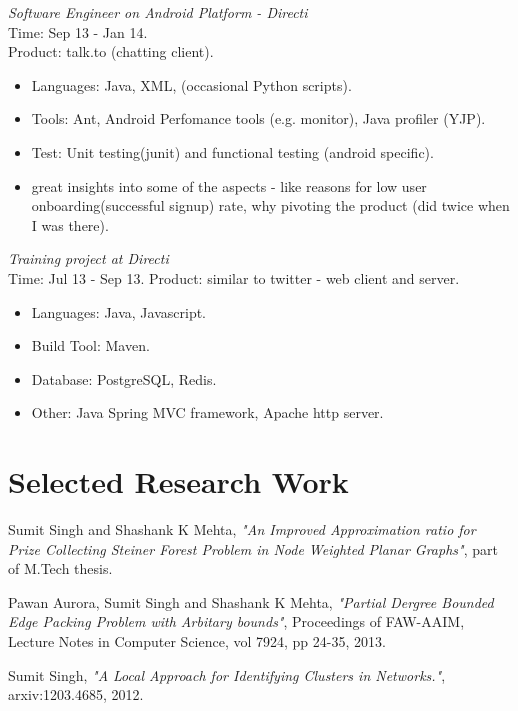 \documentclass[margin,line]{resume}
\begin{document}
\begin{resume}
\textit{Software Engineer on Android Platform - Directi} \\
Time: Sep 13 - Jan 14.\\
Product: talk.to (chatting client).\\
\begin{itemize}
\item Languages: Java, XML, (occasional Python scripts).
\item Tools: Ant, Android Perfomance tools (e.g. monitor), Java profiler (YJP).
\item Test: Unit testing(junit) and functional testing (android specific).
\item great insights into some of the aspects - like reasons for low user onboarding(successful signup) rate, why pivoting the product (did twice when I was there).
\end{itemize}

\textit{Training project at Directi}\\
Time: Jul 13 - Sep 13.
Product: similar to twitter - web client and server.\\
 \begin{itemize}
\item Languages: Java, Javascript.
\item Build Tool: Maven.
\item Database: PostgreSQL, Redis.
\item Other: Java Spring MVC framework, Apache http server.  
 \end{itemize}



    \section{\mysidestyle Selected Research Work}
\vspace{-2mm}
Sumit Singh and Shashank K Mehta, \textit{ "An Improved Approximation ratio for Prize Collecting Steiner Forest Problem in Node Weighted Planar Graphs"}, part of M.Tech thesis.

\vspace{-2mm}
Pawan Aurora, Sumit Singh and Shashank K Mehta, \textit{"Partial Dergree Bounded Edge Packing Problem with Arbitary bounds"}, Proceedings of FAW-AAIM, Lecture Notes in Computer Science, vol 7924, pp 24-35, 2013. 

\vspace{-2mm}
Sumit Singh, \textit{"A Local Approach for Identifying Clusters in Networks."}, arxiv:1203.4685, 2012.


\end{resume}
\end{document}
